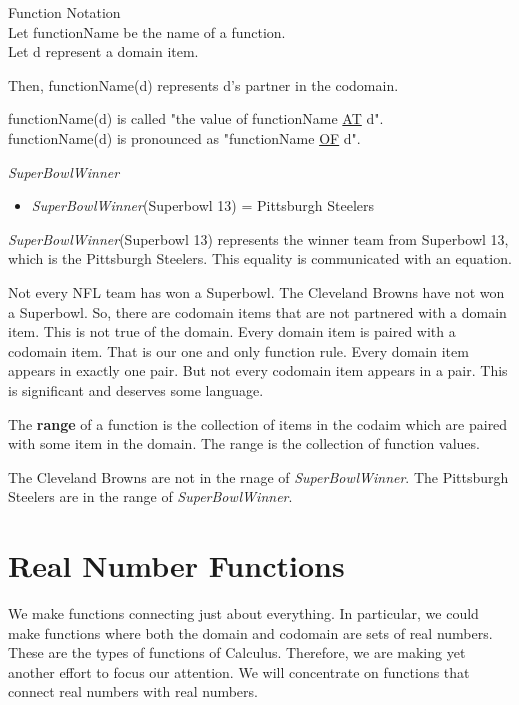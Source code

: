 \documentclass{ximera}
\begin{document}
\begin{notation} Function Notation \\
Let functionName be the name of a function. \\
Let d represent a domain item.

Then, functionName(d) represents d's partner in the codomain.

functionName(d) is called "the value of functionName \underline{AT} d". \\
functionName(d) is pronounced as "functionName \underline{OF} d".
\end{notation}



\begin{example} \textit{SuperBowlWinner}

\begin{itemize}
\item \textit{SuperBowlWinner}(Superbowl 13) = Pittsburgh Steelers  
\end{itemize}

\textit{SuperBowlWinner}(Superbowl 13) represents the winner team from Superbowl 13, which is the Pittsburgh Steelers.  This equality is communicated with an equation.

\end{example}

Not every NFL team has won a Superbowl. The Cleveland Browns have not won a Superbowl.  So, there are codomain items that are not partnered with a domain item.  This is not true of the domain.  Every domain item is paired with a codomain item.  That is our one and only function rule.  Every domain item appears in exactly one pair.  But not every codomain item appears in a pair.  This is significant and deserves some language.

The \textbf{range} of a function is the collection of items in the codaim which are paired with some item in the domain.  The range is the collection of function values.

The Cleveland Browns are not in the rnage of \textit{SuperBowlWinner}.  The Pittsburgh Steelers are in the range of \textit{SuperBowlWinner}.






\section{Real Number Functions}

We make functions connecting just about everything.  In particular, we could make functions where both the domain and codomain are sets of real numbers. These are the types of functions of Calculus.  Therefore, we are making yet another effort to focus our attention.  We will concentrate on functions that connect real numbers with real numbers.
\end{document}
